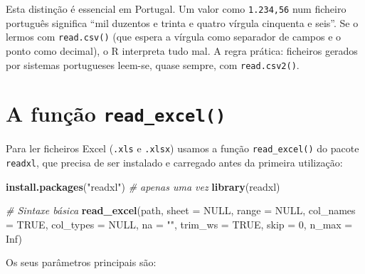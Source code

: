 \documentclass[
  portuguese,
  11pt,
  openany]{book}
\newenvironment{Shaded}{\begin{snugshade}}{\end{snugshade}}
\newcommand{\AttributeTok}[1]{\textcolor[rgb]{0.13,0.29,0.53}{#1}}
\newcommand{\CommentTok}[1]{\textcolor[rgb]{0.56,0.35,0.01}{\textit{#1}}}
\newcommand{\ConstantTok}[1]{\textcolor[rgb]{0.56,0.35,0.01}{#1}}
\newcommand{\DecValTok}[1]{\textcolor[rgb]{0.00,0.00,0.81}{#1}}
\newcommand{\FunctionTok}[1]{\textcolor[rgb]{0.13,0.29,0.53}{\textbf{#1}}}
\newcommand{\NormalTok}[1]{#1}
\newcommand{\StringTok}[1]{\textcolor[rgb]{0.31,0.60,0.02}{#1}}
\begin{document}
Esta distinção é essencial em Portugal. Um valor como \texttt{1.234,56} num ficheiro
português significa ``mil duzentos e trinta e quatro vírgula cinquenta e seis''. Se o
lermos com \texttt{read.csv()} (que espera a vírgula como separador de campos e o ponto como
decimal), o R interpreta tudo mal. A regra prática: ficheiros gerados por sistemas
portugueses leem-se, quase sempre, com \texttt{read.csv2()}.

\section{\texorpdfstring{A função \texttt{read\_excel()}}{A função read\_excel()}}\label{a-funuxe7uxe3o-read_excel}

Para ler ficheiros Excel (\texttt{.xls} e \texttt{.xlsx}) usamos a função \texttt{read\_excel()} do pacote
\texttt{readxl}, que precisa de ser instalado e carregado antes da primeira utilização:

\begin{Shaded}
\begin{Highlighting}[]
\FunctionTok{install.packages}\NormalTok{(}\StringTok{"readxl"}\NormalTok{)   }\CommentTok{\# apenas uma vez}
\FunctionTok{library}\NormalTok{(readxl)}

\CommentTok{\# Sintaxe básica}
\FunctionTok{read\_excel}\NormalTok{(path, }\AttributeTok{sheet =} \ConstantTok{NULL}\NormalTok{, }\AttributeTok{range =} \ConstantTok{NULL}\NormalTok{, }\AttributeTok{col\_names =} \ConstantTok{TRUE}\NormalTok{,}
           \AttributeTok{col\_types =} \ConstantTok{NULL}\NormalTok{, }\AttributeTok{na =} \StringTok{""}\NormalTok{, }\AttributeTok{trim\_ws =} \ConstantTok{TRUE}\NormalTok{, }\AttributeTok{skip =} \DecValTok{0}\NormalTok{, }\AttributeTok{n\_max =} \ConstantTok{Inf}\NormalTok{)}
\end{Highlighting}
\end{Shaded}

Os seus parâmetros principais são:
\end{document}

